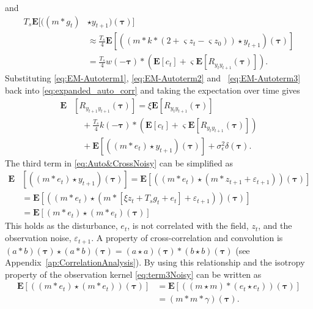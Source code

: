 \documentclass[10pt,twocolumn,twoside]{IEEEtran}
\begin{document}
and
\begin{align}\label{eq:EM-Autoterm3} 
	T_s\mathbf{E}[((m\ast g_t) &\star y_{t+1})(\boldsymbol\tau)] \nonumber \\ 
	&\approx \frac{T_s}{4}\mathbf{E}[((m \ast k \ast (2 + \varsigma z_t - \varsigma z_0))\star y_{t+1})(\boldsymbol\tau)] \nonumber \\
	&= \frac{T_s}{4} w(-\boldsymbol\tau) \ast (\mathbf{E}\left[c_t\right] + \varsigma \mathbf{E}\left[R_{y_ty_{t+1}}(\boldsymbol\tau)\right] ).
\end{align}
Substituting \eqref{eq:EM-Autoterm1}, \eqref{eq:EM-Autoterm2} and ~\eqref{eq:EM-Autoterm3} back into \eqref{eq:expanded_auto_corr} and taking the expectation over time  gives
\begin{align}\label{eq:Auto&CrossNoisy}
	\mathbf{E}&[R_{y_{t+1}y_{t+1}}(\boldsymbol{\tau})] = \xi \mathbf{E}[R_{y_ty_{t+1}}(\boldsymbol{\tau})] \nonumber \\
	&\quad+  \frac{T_s}{4} k(-\boldsymbol\tau) \ast (\mathbf{E}\left[c_t\right] + \varsigma \mathbf{E}\left[R_{y_ty_{t+1}}(\boldsymbol\tau)\right] ) \nonumber \\
	&\quad+\mathbf{E}[((m\ast e_t)\star y_{t+1})(\boldsymbol\tau)]+\sigma_{\epsilon}^2\delta(\boldsymbol{\tau}).
\end{align}
The third term in \eqref{eq:Auto&CrossNoisy} can be simplified as 
\begin{align}\label{eq:term3Noisy}
\mathbf{E}&[((m\ast e_t)\star y_{t+1})(\boldsymbol\tau)] = \mathbf{E}[((m\ast e_t)\star (m\ast z_{t+1}+\varepsilon_{t+1})) (\boldsymbol\tau)] \nonumber \\
	&= \mathbf{E}[(\left(m \ast e_t\right) \star (m \ast [\xi z_t+ T_s g_t + e_t]+\varepsilon_{t+1}))(\boldsymbol\tau)] \nonumber \\
	&=\mathbf{E}[\left(m \ast e_t\right)\star\left(m \ast e_t\right)(\boldsymbol\tau)]
\end{align} 
This holds as the disturbance, $e_t$, is not correlated with the field, $z_t$, and the observation noise, $\varepsilon_{t+1}$. A property of cross-correlation and convolution is $(a \ast b)(\boldsymbol\tau) \star (a \ast b)(\boldsymbol\tau)=(a \star a)(\boldsymbol\tau)\ast(b \star b)(\boldsymbol\tau)$ (see Appendix~\ref{ap:CorrelationAnalysis}). By using this relationship and the isotropy property of the observation kernel \eqref{eq:term3Noisy} can be written as
\begin{align}\label{eq:EM-Autoterm4}
\mathbf{E}[(\left(m \ast e_t\right)\star\left(m \ast e_t\right))(\boldsymbol\tau)]&=\mathbf{E}[(\left(m \star m\right)\ast\left(e_t \star e_t\right))(\boldsymbol\tau)] \nonumber \\
&=(m\ast m \ast \gamma)(\boldsymbol\tau).
\end{align}
\end{document}
